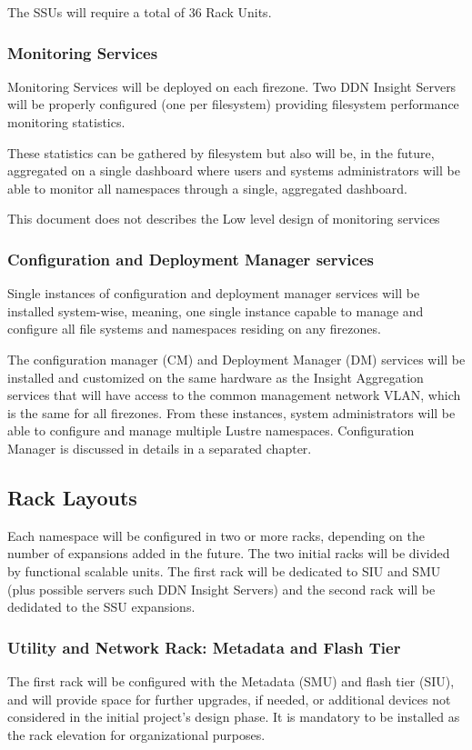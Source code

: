 \documentclass{article}
\begin{document}
The SSUs will require a total of 36 Rack Units.

\subsubsection{Monitoring Services}
Monitoring Services will be deployed on each firezone. Two DDN Insight Servers will be properly configured (one per filesystem) providing filesystem performance monitoring statistics. 

These statistics can be gathered by filesystem but also will be, in the future, aggregated on a single dashboard where users and systems administrators will be able to monitor all namespaces through a single, aggregated dashboard. 

This document does not describes the Low level design of monitoring services

\subsubsection{Configuration and Deployment Manager services}
Single instances of configuration and deployment manager services will be installed system-wise, meaning, one single instance capable to manage and configure all file systems and namespaces residing on any firezones.

The configuration manager (CM) and Deployment Manager (DM) services will be installed and customized on the same hardware as the Insight Aggregation services that will have access to the common management network VLAN, which is the same for all firezones. From these instances, system administrators will be able to configure and manage multiple Lustre namespaces. Configuration Manager is discussed in details in a separated chapter.

\subsection{Rack Layouts}
Each namespace will be configured in two or more racks, depending on the number of expansions added in the future. The two initial racks will be divided by functional scalable units. The first rack will be dedicated to SIU and SMU (plus possible servers such DDN Insight Servers) and the second rack will be dedidated to the SSU expansions.

\subsubsection{Utility and Network Rack: Metadata and Flash Tier}
The first rack will be configured with the Metadata (SMU) and flash tier (SIU), and will provide space for further upgrades, if needed, or additional devices not considered in the initial project's design phase. It is mandatory to be installed as the rack elevation for organizational purposes. 
\end{document}
